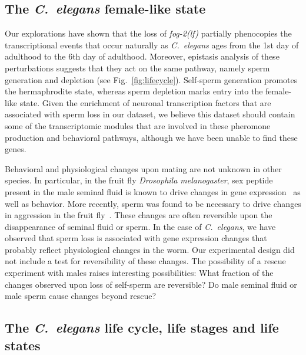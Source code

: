 \documentclass[9pt,twocolumn,twoside]{gsag3jnl}
\newcommand{\cel}{\emph{C.~elegans}}
\newcommand{\fog}{\emph{\mbox{fog-2(lf)}}}
\begin{document}
\subsection*{The \cel{} female-like state}
\label{sub:female_state}
Our explorations have shown that the loss of \fog{} partially phenocopies the
transcriptional events that occur naturally as \cel{} ages from the 1st day of
adulthood to the 6th day of adulthood. Moreover, epistasis analysis of these
perturbations suggests that they act on the same pathway, namely sperm generation
and depletion (see Fig.~\ref{fig:lifecycle}). Self-sperm generation promotes the
hermaphrodite state, whereas sperm depletion marks entry into the female-like
state. Given the enrichment of neuronal transcription factors that are
associated with sperm loss in our dataset, we believe this dataset should
contain some of the transcriptomic modules that are involved in these pheromone
production and behavioral pathways, although we have been unable to find these
genes.

Behavioral and physiological changes upon mating are not unknown in other
species. In particular, in the fruit fly \emph{Drosophila melanogaster}, sex
peptide present in the male seminal fluid is known to drive changes in gene
expression~\citep{Liu2003,Xue2000,Avila2011,Heifetz2014,Rezaval2014,Mack2006} as
well as behavior. More recently, sperm was found to be necessary to drive
changes in aggression in the fruit fly~\citep{Bath2017}. These changes are often
reversible upon the disappearance of seminal fluid or sperm. In the case of
\cel{}, we have observed that sperm loss is associated with gene expression
changes that probably reflect physiological changes in the worm. Our
experimental design did not include a test for reversibility of these changes.
The possibility of a rescue experiment with males raises interesting
possibilities: What fraction of the changes observed upon loss of self-sperm are
reversible? Do male seminal fluid or male sperm cause changes beyond rescue?

\subsection*{The \cel{} life cycle, life stages and life states}
\end{document}
